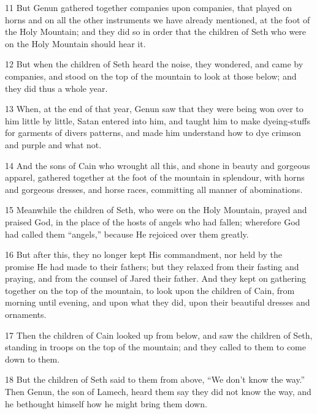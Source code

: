 \par 11 But Genun gathered together companies upon companies, that played on horns and on all the other instruments we have already mentioned, at the foot of the Holy Mountain; and they did so in order that the children of Seth who were on the Holy Mountain should hear it.

\par 12 But when the children of Seth heard the noise, they wondered, and came by companies, and stood on the top of the mountain to look at those below; and they did thus a whole year.

\par 13 When, at the end of that year, Genun saw that they were being won over to him little by little, Satan entered into him, and taught him to make dyeing-stuffs for garments of divers patterns, and made him understand how to dye crimson and purple and what not.

\par 14 And the sons of Cain who wrought all this, and shone in beauty and gorgeous apparel, gathered together at the foot of the mountain in splendour, with horns and gorgeous dresses, and horse races, committing all manner of abominations.

\par 15 Meanwhile the children of Seth, who were on the Holy Mountain, prayed and praised God, in the place of the hosts of angels who had fallen; wherefore God had called them “angels,” because He rejoiced over them greatly.

\par 16 But after this, they no longer kept His commandment, nor held by the promise He had made to their fathers; but they relaxed from their fasting and praying, and from the counsel of Jared their father. And they kept on gathering together on the top of the mountain, to look upon the children of Cain, from morning until evening, and upon what they did, upon their beautiful dresses and ornaments.

\par 17 Then the children of Cain looked up from below, and saw the children of Seth, standing in troops on the top of the mountain; and they called to them to come down to them.

\par 18 But the children of Seth said to them from above, “We don't know the way.” Then Genun, the son of Lamech, heard them say they did not know the way, and he bethought himself how he might bring them down.


